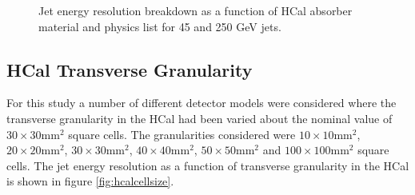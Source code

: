 \begin{figure}
\centering
{}
\caption[Jet energy resolution breakdown as a function of HCal absorber material and physics list for 45 and 250 GeV jets.]{Jet energy resolution breakdown as a function of HCal absorber material and physics list for 45 and 250 GeV jets.}
\label{fig:hcalabsmaterialbreak}
\end{figure}


\subsection{HCal Transverse Granularity}
\label{sec:hcalcells}
For this study a number of different detector models were considered where the transverse granularity in the HCal had been varied about the nominal value of $30 \times 30 \text{mm}^{2}$ square cells.  The granularities considered were $10 \times 10 \text{mm}^{2}$, $20 \times 20 \text{mm}^{2}$, $30 \times 30 \text{mm}^{2}$, $40 \times 40 \text{mm}^{2}$, $50 \times 50 \text{mm}^{2}$ and $100 \times 100 \text{mm}^{2}$ square cells.  The jet energy resolution as a function of transverse granularity in the HCal is shown in figure \ref{fig:hcalcellsize}.

